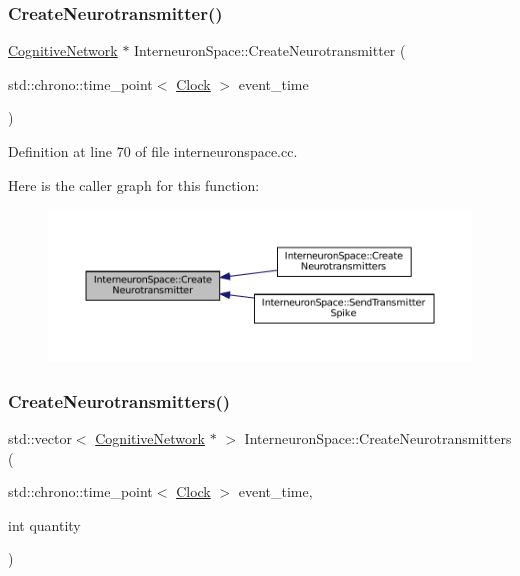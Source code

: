 \subsubsection{\texorpdfstring{Create\+Neurotransmitter()}{CreateNeurotransmitter()}}
{\footnotesize\ttfamily \mbox{\hyperlink{class_cognitive_network}{Cognitive\+Network}} $\ast$ Interneuron\+Space\+::\+Create\+Neurotransmitter (\begin{DoxyParamCaption}\item[{std\+::chrono\+::time\+\_\+point$<$ \mbox{\hyperlink{universe_8h_a0ef8d951d1ca5ab3cfaf7ab4c7a6fd80}{Clock}} $>$}]{event\+\_\+time }\end{DoxyParamCaption})}



Definition at line 70 of file interneuronspace.\+cc.

Here is the caller graph for this function\+:\nopagebreak
\begin{figure}[H]
\begin{center}
\leavevmode
\includegraphics[width=350pt]{class_interneuron_space_a26d98a0ae78ce363ab93e92cf0c973e7_icgraph}
\end{center}
\end{figure}
\mbox{\label{class_interneuron_space_af69f7190226d77a30a80d66d7c28e0ba}} 
\subsubsection{\texorpdfstring{Create\+Neurotransmitters()}{CreateNeurotransmitters()}}
{\footnotesize\ttfamily std\+::vector$<$ \mbox{\hyperlink{class_cognitive_network}{Cognitive\+Network}} $\ast$ $>$ Interneuron\+Space\+::\+Create\+Neurotransmitters (\begin{DoxyParamCaption}\item[{std\+::chrono\+::time\+\_\+point$<$ \mbox{\hyperlink{universe_8h_a0ef8d951d1ca5ab3cfaf7ab4c7a6fd80}{Clock}} $>$}]{event\+\_\+time,  }\item[{int}]{quantity }\end{DoxyParamCaption})}



